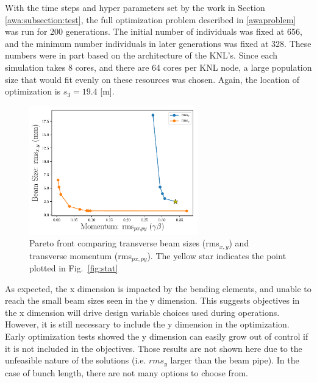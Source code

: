 With the time steps and hyper parameters set by the work in Section \ref{awa:subsection:test}, 
the full optimization problem described in \ref{awaproblem} was run for 200 generations.
The initial number of individuals was fixed at 656, 
and the minimum number individuals in later generations was fixed at 328. 
These numbers were in part based on the architecture of the KNL's. 
Since each simulation takes 8 cores, and there are 64 cores per KNL node, 
a large population size that would fit evenly on these resources was chosen. 
Again, the location of optimization is $s_3=19.4$ [m]. 
\begin{figure}
	\begin{center}		
		\includegraphics[width=0.65\textwidth]{figures/paperedit_pareto_front_Q5_xy_vs_pxpy}
	\end{center} 
		\caption{Pareto front comparing transverse beam sizes (rms$_{x,y}$) and transverse momentum (rms$_{px,py}$). The yellow star indicates the 
		point plotted in Fig.~\ref{fig:stat}}
	\label{fig:pareto1}
\end{figure}
 
As expected, the x dimension is impacted by the bending elements, and unable to reach 
the small beam sizes seen in the y dimension. This suggests objectives in the x 
dimension will drive design variable choices used during operations. 
However, it is still necessary to 
include the y dimension in the optimization. Early optimization tests showed the y dimension 
can easily grow out of control if it is not included in the objectives.
Those results are not shown here due to the unfeasible nature of the solutions 
(i.e. $rms_y$ larger than the beam pipe).
In the case of bunch length, there are not many options to choose from.


